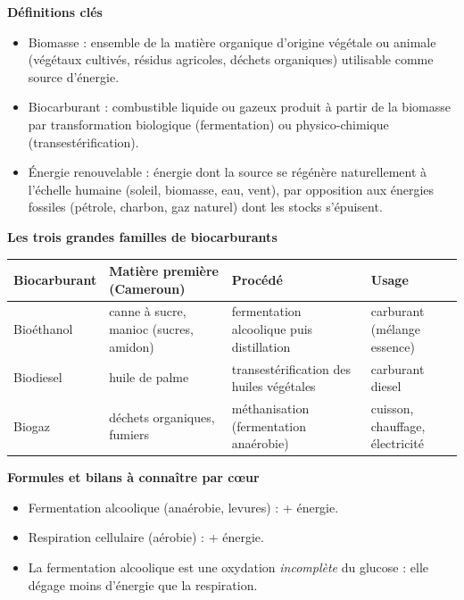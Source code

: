 \documentclass[11pt]{article}
\newcommand{\cle}[1]{{\popxbold\color{popdark}#1}}
\begin{document}
\begin{bilan}
\textbf{Définitions clés}
\begin{itemize}
  \item \cle{Biomasse} : ensemble de la matière organique d'origine végétale ou animale (végétaux cultivés, résidus agricoles, déchets organiques) utilisable comme source d'énergie.
  \item \cle{Biocarburant} : combustible liquide ou gazeux produit à partir de la biomasse par transformation biologique (fermentation) ou physico-chimique (transestérification).
  \item \cle{Énergie renouvelable} : énergie dont la source se régénère naturellement à l'échelle humaine (soleil, biomasse, eau, vent), par opposition aux énergies fossiles (pétrole, charbon, gaz naturel) dont les stocks s'épuisent.
\end{itemize}

\textbf{Les trois grandes familles de biocarburants}
\begin{center}
\begin{tabularx}{\linewidth}{|l|X|X|X|}
\hline
\rowcolor{popblueL} \textbf{Biocarburant} & \textbf{Matière première (Cameroun)} & \textbf{Procédé} & \textbf{Usage} \\
\hline
Bioéthanol & canne à sucre, manioc (sucres, amidon) & fermentation alcoolique puis distillation & carburant (mélange essence) \\
\hline
Biodiesel & huile de palme & transestérification des huiles végétales & carburant diesel \\
\hline
Biogaz & déchets organiques, fumiers & méthanisation (fermentation anaérobie) & cuisson, chauffage, électricité \\
\hline
\end{tabularx}
\end{center}

\textbf{Formules et bilans à connaître par c\oe ur}
\begin{itemize}
  \item Fermentation alcoolique (anaérobie, levures) :  + énergie.
  \item Respiration cellulaire (aérobie) :  + énergie.
  \item La fermentation alcoolique est une oxydation \emph{incomplète} du glucose : elle dégage moins d'énergie que la respiration.
\end{itemize}


\end{bilan}
\end{document}
